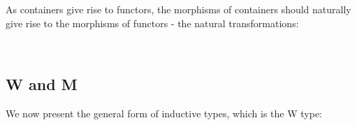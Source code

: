 As containers give rise to functors, the morphisms of containers should naturally give rise to the morphisms of functors - the natural transformations:

\begin{code}%
\>[0]\AgdaSpace{}%
\AgdaSymbol{:}\AgdaSpace{}%
\AgdaSpace{}%
\AgdaSpace{}%
\AgdaSpace{}%
\AgdaSpace{}%
\AgdaSymbol{(}\AgdaSpace{}%
\AgdaSymbol{:}\AgdaSpace{}%
\AgdaSymbol{)}\AgdaSpace{}%
\AgdaSpace{}%
\AgdaSpace{}%
\AgdaSpace{}%
\AgdaSpace{}%
\AgdaSpace{}%
\AgdaSpace{}%
\AgdaSpace{}%
\AgdaSpace{}%
\AgdaSpace{}%
\<%
\\
\>[0]\AgdaSpace{}%
\AgdaSpace{}%
\AgdaSpace{}%
\AgdaSpace{}%
\AgdaSpace{}%
\AgdaSpace{}%
\AgdaSymbol{(}\AgdaSpace{}%
\AgdaOperator{\AgdaInductiveConstructor{,}}\AgdaSpace{}%
\AgdaSymbol{)}\AgdaSpace{}%
\AgdaSymbol{=}\AgdaSpace{}%
\AgdaSpace{}%
\AgdaSpace{}%
\AgdaOperator{\AgdaInductiveConstructor{,}}\AgdaSpace{}%
\AgdaSpace{}%
\AgdaSpace{}%
\AgdaSpace{}%
\<%
\end{code}

\subsection{W and M}

We now present the general form of inductive types, which is the W type:

\begin{code}%
\>[0]\AgdaSpace{}%
\AgdaSpace{}%
\AgdaSymbol{(}\AgdaSpace{}%
\AgdaSymbol{:}\AgdaSpace{}%
\AgdaSymbol{)}\AgdaSpace{}%
\AgdaSymbol{:}\AgdaSpace{}%
\AgdaSpace{}%
\<%
\\
\>[0][@{}l@{\AgdaIndent{0}}]%
\>[2]\AgdaSpace{}%
\AgdaSymbol{:}\AgdaSpace{}%
\AgdaSpace{}%
\AgdaSpace{}%
\AgdaSpace{}%
\AgdaSymbol{(}\AgdaSpace{}%
\AgdaSymbol{)}\AgdaSpace{}%
\AgdaSpace{}%
\AgdaSpace{}%
\<%
\end{code}

